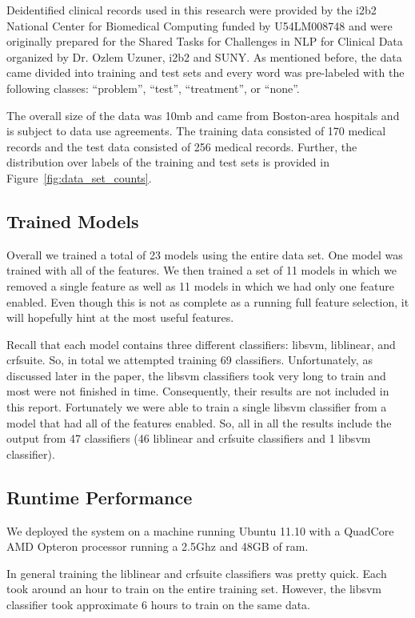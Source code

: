 \documentclass[preprint]{style}
\begin{document}
Deidentified clinical records used in this research were provided by the i2b2 National Center for Biomedical Computing funded by U54LM008748 and were originally prepared for the Shared Tasks for Challenges in NLP for Clinical Data organized by Dr. Ozlem Uzuner, i2b2 and SUNY. As mentioned before, the data came divided into training and test sets and every word was pre-labeled with the following classes: ``problem'', ``test'', ``treatment'', or ``none''. 

The overall size of the data was 10mb and came from Boston-area hospitals and is subject to data use agreements. The training data consisted of 170 medical records and the test data consisted of 256 medical records. Further, the distribution over labels of the training and test sets is provided in Figure~\ref{fig:data_set_counts}.



\subsection{Trained Models}

Overall we trained a total of 23 models using the entire data set. One model was trained with all of the features. We then trained a set of 11 models in which we removed a single feature as well as 11 models in which we had only one feature enabled. Even  though this is not as complete as a running full feature selection, it will hopefully hint at the most useful features.

Recall that each model contains three different classifiers: libsvm, liblinear, and crfsuite. So, in total we attempted training 69 classifiers. Unfortunately, as discussed later in the paper, the libsvm classifiers took very long to train and most were not finished in time. Consequently, their results are not included in this report. Fortunately we were able to train a single libsvm classifier from a model that had all of the features enabled.  So, all in all the results include the output from 47 classifiers (46 liblinear and crfsuite classifiers and 1 libsvm classifier).

\subsection{Runtime Performance}

We deployed the system on a machine running Ubuntu 11.10 with a QuadCore AMD Opteron processor running a 2.5Ghz and 48GB of ram.

In general training the liblinear and crfsuite classifiers was pretty quick. Each took around an hour to train on the entire training set. However, the libsvm classifier took approximate 6 hours to train on the same data.
\end{document}
